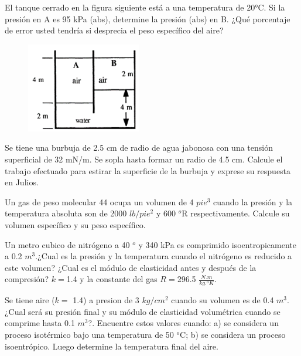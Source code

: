 \documentclass[12pt, a4paper]{exam}
\begin{document}
\begin{questions}
 \question 	El tanque cerrado en la figura siguiente está a una temperatura de 20°C. Si la presión en A es 95 kPa (abs), determine la presión (abs) en B. ¿Qué porcentaje de error usted tendría si desprecia el peso específico del aire?
 \begin{figure}[h]
    \includegraphics[width=5cm]{aguaAire.png}
    \centering
    \end{figure}
    
\question Se tiene una burbuja de 2.5 cm de radio de agua jabonosa con una tensión superficial de 32 mN/m. Se sopla hasta formar un radio de 4.5 cm. Calcule el trabajo efectuado para estirar la superficie de la burbuja y exprese su respuesta en Julios.

\question Un gas de peso molecular 44 ocupa un volumen de 4 $pie^3$ cuando la presi\'on y la temperatura absoluta son de 2000 $lb/pie^2$ y 600 $^o$R respectivamente. Calcule su volumen espec\'ifico y su peso espec\'ifico.

\question Un metro cubico de nitr\'ogeno a 40 $^o$ y 340 kPa es comprimido isoentropicamente a 0.2 $m^3$.¿Cual es la presi\'on y la temperatura cuando el nitr\'ogeno es reducido a este volumen? ¿Cual es el m\'odulo de elasticidad antes y despu\'es de la compresi\'on? $k =$1.4 y la constante del gas $R =$296.5 $\frac{N.m}{kg. ^oK}$.

\question Se tiene aire ($k =$ 1.4) a presion de 3 $kg/cm^2$ cuando su volumen es de 0.4 $m^3$. ¿Cual ser\'a su presi\'on final y su m\'odulo de elasticidad volum\'etrica cuando se comprime hasta 0.1 $m^3$?. Encuentre estos valores cuando: a) se considera un proceso isot\'ermico bajo una temperatura de 50 $^o$C; b) se considera un proceso isoentr\'opico. Luego determine la temperatura final del aire.



\end{questions}
\end{document}
